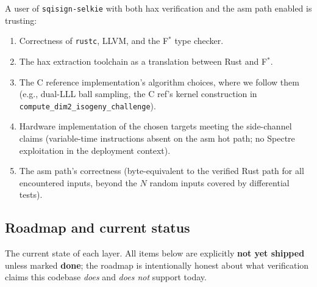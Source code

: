 A user of \texttt{sqisign-selkie} with both hax verification and
the asm path enabled is trusting:
\begin{enumerate}[nosep]
  \item Correctness of \texttt{rustc}, LLVM, and the F$^*$ type
        checker.
  \item The hax extraction toolchain as a translation between
        Rust and F$^*$.
  \item The C reference implementation's algorithm choices, where
        we follow them (e.g., dual-LLL ball sampling, the C ref's
        kernel construction in
        \texttt{compute\_dim2\_isogeny\_challenge}).
  \item Hardware implementation of the chosen targets meeting the
        side-channel claims (variable-time instructions absent on
        the asm hot path; no Spectre exploitation in the
        deployment context).
  \item The asm path's correctness (byte-equivalent to the
        verified Rust path for all encountered inputs, beyond the
        $N$ random inputs covered by differential tests).
\end{enumerate}

\subsection{Roadmap and current status}

The current state of each layer.  All items below are explicitly
\textbf{not yet shipped} unless marked \textbf{done}; the roadmap is
intentionally honest about what verification claims this codebase
\emph{does} and \emph{does not} support today.

